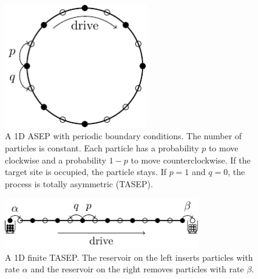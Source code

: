\begin{figure}[h]
    \centering
    \includegraphics[width=0.55\textwidth]{tasep_a.pdf}
    \caption{A 1D ASEP with periodic boundary conditions. The number of particles is constant. Each particle has a probability $p$ to move clockwise and a probability $1-p$ to move counterclockwise. If the target site is occupied, the particle stays. If $p=1$ and $q=0$, the process is totally asymmetric (TASEP).}
    \label{fig:tasep_1d_periodic}
\end{figure}

\begin{figure}[h]
    \centering
    \includegraphics[width=0.75\textwidth]{tasep_b.pdf}
    \caption{A 1D finite TASEP. The reservoir on the left inserts particles with rate $\alpha$ and the reservoir on the right removes particles with rate $\beta$.}
    \label{fig:tasep_1d_finite}
\end{figure}



